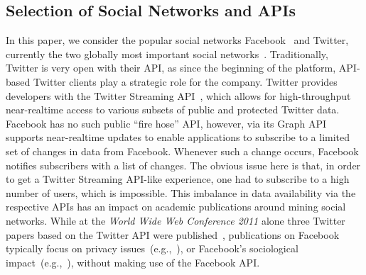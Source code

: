 \documentclass{iosart2c}
\begin{document}
\subsection{Selection of Social Networks and APIs}
In this paper, we consider the popular social networks Facebook~\cite{Facebook} and Twitter\cite{Twitter}, currently the two globally most important social networks~\cite{comScoreTwitter, comScoreFacebook}.
Traditionally, Twitter is very open with their API, as since the beginning of the platform, API-based Twitter clients  play a strategic role for the company.
Twitter provides developers with the Twitter Streaming API~\cite{TwitterStreamingAPI}, which allows for high-throughput near-realtime access to various subsets of public and protected Twitter data.
Facebook has no such public ``fire hose'' API, however, via its Graph API~\cite{FacebookRealtimeAPI} supports near-realtime updates to enable applications to subscribe to a limited set of changes in data from Facebook.
Whenever such a change occurs, Facebook notifies subscribers with a list of changes.
The obvious issue here is that, in order to get a Twitter Streaming API-like experience, one had to subscribe to a high number of users, which is impossible.
This imbalance in data availability via the respective APIs has an impact on academic publications around mining social networks.
While at the \textit{World Wide Web Conference 2011} alone three Twitter papers based on the Twitter API were published~\cite{Meeder:2011:WKY:1963405.1963479, Romero:2011:DMI:1963405.1963503, Wu:2011:SWT:1963405.1963504}, publications on Facebook typically focus on privacy issues~(e.g.,~\cite{liu:settings}), or Facebook's sociological impact~(e.g.,~\cite{JCC4:JCC4367}), without making use of the Facebook API.
\end{document}
